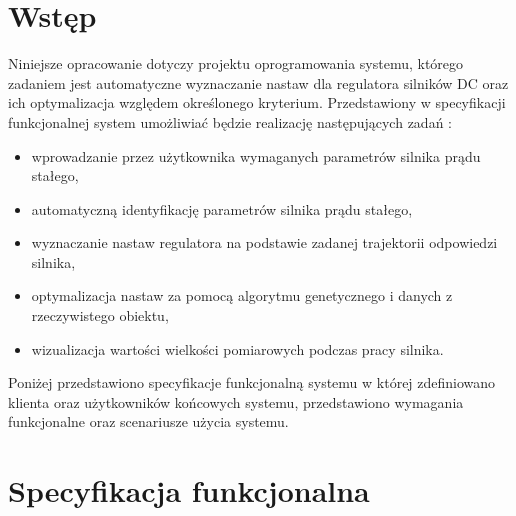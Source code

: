 \section{Wstęp}

\indent Niniejsze opracowanie dotyczy projektu oprogramowania systemu, którego zadaniem jest automatyczne wyznaczanie nastaw dla regulatora silników DC oraz ich optymalizacja względem określonego kryterium. 
\newline Przedstawiony w specyfikacji funkcjonalnej system umożliwiać będzie realizację następujących zadań :
\begin{itemize}
\item wprowadzanie przez użytkownika wymaganych parametrów silnika prądu stałego,
\item automatyczną identyfikację parametrów silnika prądu stałego,
\item wyznaczanie nastaw regulatora na podstawie zadanej trajektorii odpowiedzi silnika,
\item optymalizacja nastaw za pomocą algorytmu genetycznego i danych z rzeczywistego obiektu,
\item wizualizacja wartości wielkości pomiarowych podczas pracy silnika.
\end{itemize}
Poniżej przedstawiono specyfikacje funkcjonalną systemu w której zdefiniowano klienta oraz użytkowników końcowych systemu, przedstawiono wymagania funkcjonalne oraz scenariusze użycia systemu.
\section{Specyfikacja funkcjonalna}
